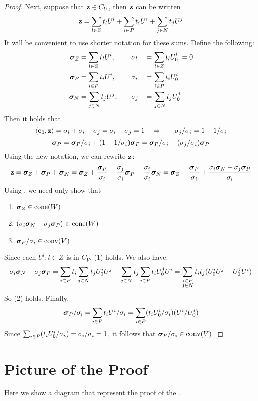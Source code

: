 \begin{proof}
	Next, suppose that $\mathbf{z} \in C_U$, then $\mathbf{z}$ can be written
	\[ \mathbf{z} = \sum_{l\in Z} t_l U^l + \sum_{i\in P} t_i U^i + \sum_{j\in N} t_j U^j \]
	It will be convenient to use shorter notation for these sums.  Define the following:
	\begin{alignat*}{3}
		\bm{\sigma}_Z & = \sum_{l\in Z} t_l U^l, \quad &  & \sigma_l \, & = & \, \sum_{l\in Z} t_l U^l_{0} \;= 0 \\
		\bm{\sigma}_P & = \sum_{i\in P} t_i U^i, \quad &  & \sigma_i \, & = & \, \sum_{i\in P} t_i U^i_{0}       \\
		\bm{\sigma}_N & = \sum_{j\in N} t_j U^j, \quad &  & \sigma_j \, & = & \, \sum_{j\in N} t_j U^j_{0}
	\end{alignat*}
	Then it holds that
	\[ \left\langle \mathbf{e}_0, \mathbf{z} \right\rangle = \sigma_l + \sigma_i + \sigma_j = \sigma_i + \sigma_j = 1
		\quad\Rightarrow\quad -\sigma_j/\sigma_i = 1 - 1/\sigma_i \]
	\[ \bm{\sigma}_P = \bm{\sigma}_P/\sigma_i + (1-1/\sigma_i)\bm{\sigma}_P
		= \bm{\sigma}_P/\sigma_i - (\sigma_j/\sigma_i)\bm{\sigma}_P \]
	Using the new notation, we can rewrite $\mathbf{z}$:
	\[ \mathbf{z} = \bm{\sigma}_Z + \bm{\sigma}_P + \bm{\sigma}_N
		= \bm{\sigma}_Z + \frac{\bm{\sigma}_P}{\sigma_i} - \frac{\sigma_j}{\sigma_i}\bm{\sigma}_P
		+ \frac{\sigma_i}{\sigma_i}\bm{\sigma}_N
		= \bm{\sigma}_Z + \frac{\bm{\sigma}_P}{\sigma_i} +
		\frac{\sigma_i\bm{\sigma}_N - \sigma_j\bm{\sigma}_P}{\sigma_i}
	\]
	Using , we need only show that
	\begin{enumerate}
		\item $\bm{\sigma}_Z \in \operatorname{cone}(W)$
		\item $(\sigma_i\bm{\sigma}_N - \sigma_j\bm{\sigma}_P) \in \operatorname{cone}(W)$
		\item $\bm{\sigma}_P/\sigma_i \in \operatorname{conv}(V)$
	\end{enumerate}
	Since each $U^l : l \in Z$ is in $C_V$, (1) holds.  We also have:
	\[ \sigma_i\bm{\sigma}_N - \sigma_j\bm{\sigma}_P =
		\sum_{i\in P} t_i \sum_{j\in N} t_j U^i_{0} U^j - \sum_{j\in N} t_j \sum_{i\in P} t_i U^j_{0} U^i =
		\sum_{\substack{i\in P \\ j\in N}} t_i t_j(U^i_{0} U^j - U^j_{0} U^i) \]
	So (2) holds.  Finally,
	\[ \bm{\sigma}_P/\sigma_i = \sum_{i\in P} t_i U^i / \sigma_i = \sum_{i\in P} (t_i U^i_{0}/\sigma_i)(U^i/U^i_{0}) \]
	Since $\sum_{i\in P} (t_i U^i_{0}/\sigma_i) = \sigma_i / \sigma_i = 1$, it follows that $\bm{\sigma}_P / \sigma_i \in \operatorname{conv}(V)$.
\end{proof}

\section{Picture of the Proof}
Here we show a diagram that represent the proof of the {\MWT}.

